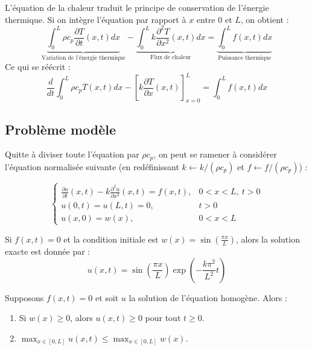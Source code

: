 \begin{remarque}
L'équation de la chaleur traduit le principe de conservation de l'énergie thermique. Si on intègre l'équation par rapport à $x$ entre $0$ et $L$, on obtient :
\[
    \underbrace{\int_0^L \rho c_p \frac{\partial T}{\partial t}(x,t) dx}_{\text{Variation de l'énergie thermique}} - \underbrace{\int_0^L k \frac{\partial^2 T}{\partial x^2}(x,t) dx}_{\text{Flux de chaleur}} = \underbrace{\int_0^L f(x,t) dx}_{\text{Puissance thermique}}
\]
Ce qui se réécrit :
\[
    \frac{d}{dt} \int_0^L \rho c_p T(x,t) dx - \left[ k \frac{\partial T}{\partial x}(x,t) \right]_{x=0}^L = \int_0^L f(x,t) dx
\]
\end{remarque}

\subsection{Problème modèle}

Quitte à diviser toute l'équation par $\rho c_p$, on peut se ramener à considérer l'équation normalisée suivante (en redéfinissant $k \leftarrow k/(\rho c_p)$ et $f \leftarrow f/(\rho c_p)$) :

\begin{equation}
\begin{cases}
    \frac{\partial u}{\partial t}(x,t) - k \frac{\partial^2 u}{\partial x^2}(x,t) = f(x,t), & 0 < x < L, \ t > 0 \\
    u(0,t) = u(L,t) = 0, & t > 0 \\
    u(x,0) = w(x), & 0 < x < L
\end{cases}
\end{equation}

\begin{exemple}
Si $f(x,t) = 0$ et la condition initiale est $w(x) = \sin\left(\frac{\pi x}{L}\right)$, alors la solution exacte est donnée par :
\[
    u(x,t) = \sin\left(\frac{\pi x}{L}\right) \exp\left(-\frac{k \pi^2}{L^2} t\right)
\]
\end{exemple}

\begin{proposition}
Supposons $f(x,t) = 0$ et soit $u$ la solution de l'équation homogène. Alors :
\begin{enumerate}
    \item Si $w(x) \ge 0$, alors $u(x,t) \ge 0$ pour tout $t \ge 0$.
    \item $\max_{x \in [0,L]} u(x,t) \le \max_{x \in [0,L]} w(x)$.
\end{enumerate}
\end{proposition}

